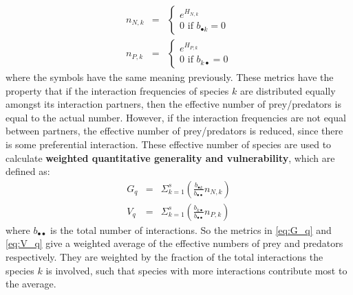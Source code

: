 \begin{eqnarray}
n_{N,k} &=& \begin{cases} e^{H_{N,k}}  \\ 0 \mbox{     if } b_{\bullet k}=0 \end{cases} \label{eq:effective_prey} \\
n_{P,k} &=& \begin{cases} e^{H_{P,k}}  \\ 0 \mbox{     if } b_{k\bullet}=0 \end{cases} \label{eq:effective_pred}
\end{eqnarray}
%
where the symbols have the same meaning previously. These metrics have the property that if the interaction frequencies of species $k$ are distributed equally amongst its interaction partners, then the effective number of prey/predators is equal to the actual number. However, if the interaction frequencies are not equal between partners, the effective number of prey/predators is reduced, since there is some preferential interaction. These effective number of species are used to calculate \textbf{weighted quantitative generality and vulnerability}, which are defined as:  
\begin{eqnarray}
G_q &=& \Sigma_{k=1}^{s} \left( \frac{b_{\bullet k}}{b_{\bullet \bullet }} n_{N,k} \right) \label{eq:G_q} \\
V_q &=& \Sigma_{k=1}^{s} \left( \frac{b_{k\bullet }}{b_{\bullet \bullet }} n_{P,k} \right) \label{eq:V_q}
\end{eqnarray}
%
where $b_{\bullet \bullet }$ is the total number of interactions. So the metrics in \eqref{eq:G_q} and \eqref{eq:V_q} give a weighted average of the effective numbers of prey and predators respectively. They are weighted by the fraction of the total interactions the species $k$ is involved, such that species with more interactions contribute most to the average.

